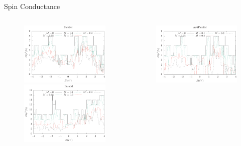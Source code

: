 \documentclass[handout,t]{beamer}
\begin{document}
\begin{frame}{Spin Conductance}
	\begin{columns}[t]
		\begin{column}[t]{0.5\linewidth}
			\begin{figure}
				\raggedleft
				\includegraphics[width=0.88\linewidth]{../figures/armchair-parallel-conductance-revise-thesis.eps}\\
				\includegraphics[width=0.88\linewidth]{../figures/zigzag-parallel-conductance-revise-thesis.eps}
			  \end{figure}
		\end{column}
		\begin{column}[t]{0.5\linewidth}
			\begin{figure}
				\raggedleft
				\includegraphics[width=0.88\linewidth]{../figures/armchair-antiparallel-conductance-revise-thesis.eps}\\

\end{figure}
\end{column}
\end{columns}
\end{frame}
\end{document}
